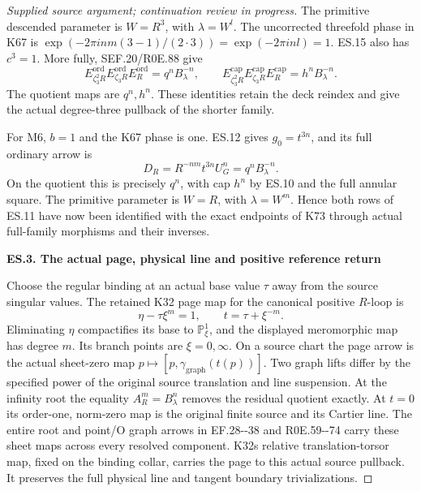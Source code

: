 \begin{proof}[Supplied source argument; continuation review in progress]
The primitive descended parameter is \(W=R^3\), with
\(\lambda=W^l\). The uncorrected threefold phase in K67 is
\(\exp(-2\pi i n m(3-1)/(2\cdot3))=\exp(-2\pi i nl)=1\).
ES.15 also has \(c^3=1\). More fully, SEF.20/R0E.88 give
\[
 E_{\zeta_3^2R}^{\mathrm{ord}}
 E_{\zeta_3R}^{\mathrm{ord}}E_R^{\mathrm{ord}}
 =q^nB_\lambda^{-n},
 \qquad
 E_{\zeta_3^2R}^{\mathrm{cap}}
 E_{\zeta_3R}^{\mathrm{cap}}E_R^{\mathrm{cap}}
 =h^nB_\lambda^{-n}.
 \tag{ES.20}
\]
The quotient maps are \(q^n,h^n\). These identities retain
the deck reindex and give the actual degree-three pullback of
the shorter family.

For M6, \(b=1\) and the K67 phase is one. ES.12 gives
\(g_0=t^{3n}\), and its full ordinary arrow is
\[
 D_R=R^{-nm}t^{3n}U_G^n=q^nB_\lambda^{-n}.
 \tag{ES.21}
\]
On the quotient this is precisely \(q^n\), with cap \(h^n\)
by ES.10 and the full annular square. The primitive parameter
is \(W=R\), with \(\lambda=W^m\). Hence both rows of ES.11
have now been identified with the exact endpoints of K73
through actual full-family morphisms and their inverses.

\par

\medskip\noindent\textbf{ES.3. The actual page, physical line and positive reference return}

\par\nobreak

Choose the regular binding at an actual base value \(\tau\)
away from the source singular values. The retained K32 page
map for the canonical positive \(R\)-loop is
\[
 \eta-\tau\xi^m=1,\qquad
 t=\tau+\xi^{-m}.
 \tag{ES.22}
\]
Eliminating \(\eta\) compactifies its base to
\(\mathbb P^1_\xi\), and the displayed meromorphic map has
degree \(m\). Its branch points are \(\xi=0,\infty\).
On a source chart the page arrow is the actual sheet-zero
map \(p\mapsto[p,\gamma_{\mathrm{graph}}(t(p))]\).
Two graph lifts differ by the specified power of the original
source translation and line suspension. At the infinity root
the equality \(A_R^m=B_\lambda^n\) removes the residual
quotient exactly. At \(t=0\) its order-one, norm-zero map is
the original finite source and its Cartier line. The entire
root and point/O graph arrows in EF.28-\/-38 and R0E.59-\/-74
carry these sheet maps across every resolved component.
K32\textquotesingle s relative translation-torsor map, fixed on the binding
collar, carries the page to this actual source pullback.
It preserves the full physical line and tangent boundary
trivializations.


\end{proof}
